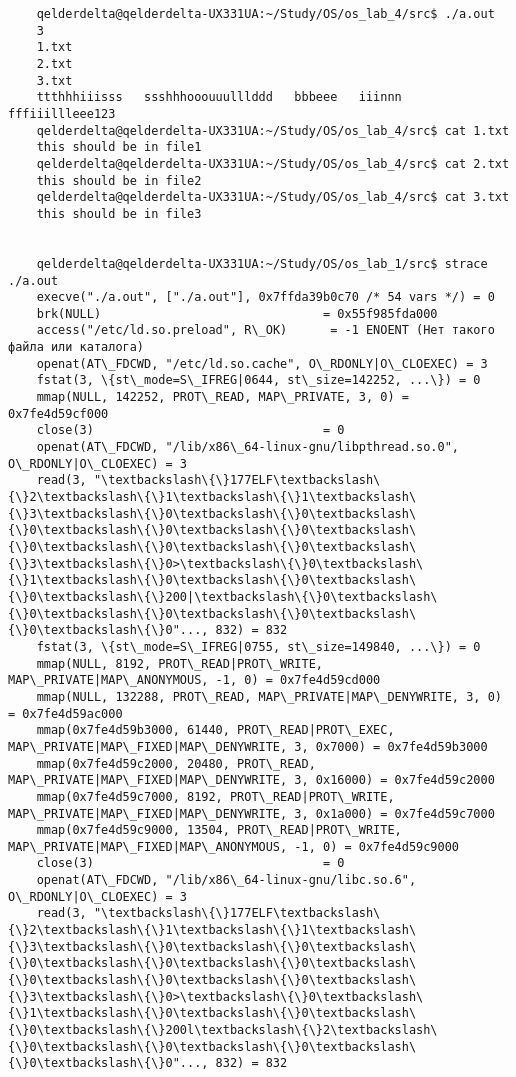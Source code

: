 \documentclass[a4paper, 12pt]{article}
\begin{document}
\begin{verbatim}
	qelderdelta@qelderdelta-UX331UA:~/Study/OS/os_lab_4/src$ ./a.out
	3
	1.txt
	2.txt
	3.txt
	ttthhhiiisss   ssshhhooouuulllddd   bbbeee   iiinnn   fffiiillleee123                            
	qelderdelta@qelderdelta-UX331UA:~/Study/OS/os_lab_4/src$ cat 1.txt
	this should be in file1
	qelderdelta@qelderdelta-UX331UA:~/Study/OS/os_lab_4/src$ cat 2.txt
	this should be in file2
	qelderdelta@qelderdelta-UX331UA:~/Study/OS/os_lab_4/src$ cat 3.txt
	this should be in file3
	
	
	qelderdelta@qelderdelta-UX331UA:~/Study/OS/os_lab_1/src$ strace ./a.out
	execve("./a.out", ["./a.out"], 0x7ffda39b0c70 /* 54 vars */) = 0
	brk(NULL)                               = 0x55f985fda000
	access("/etc/ld.so.preload", R\_OK)      = -1 ENOENT (Нет такого файла или каталога)
	openat(AT\_FDCWD, "/etc/ld.so.cache", O\_RDONLY|O\_CLOEXEC) = 3
	fstat(3, \{st\_mode=S\_IFREG|0644, st\_size=142252, ...\}) = 0
	mmap(NULL, 142252, PROT\_READ, MAP\_PRIVATE, 3, 0) = 0x7fe4d59cf000
	close(3)                                = 0
	openat(AT\_FDCWD, "/lib/x86\_64-linux-gnu/libpthread.so.0", O\_RDONLY|O\_CLOEXEC) = 3
	read(3, "\textbackslash\{\}177ELF\textbackslash\{\}2\textbackslash\{\}1\textbackslash\{\}1\textbackslash\{\}3\textbackslash\{\}0\textbackslash\{\}0\textbackslash\{\}0\textbackslash\{\}0\textbackslash\{\}0\textbackslash\{\}0\textbackslash\{\}0\textbackslash\{\}0\textbackslash\{\}3\textbackslash\{\}0>\textbackslash\{\}0\textbackslash\{\}1\textbackslash\{\}0\textbackslash\{\}0\textbackslash\{\}0\textbackslash\{\}200|\textbackslash\{\}0\textbackslash\{\}0\textbackslash\{\}0\textbackslash\{\}0\textbackslash\{\}0\textbackslash\{\}0"..., 832) = 832
	fstat(3, \{st\_mode=S\_IFREG|0755, st\_size=149840, ...\}) = 0
	mmap(NULL, 8192, PROT\_READ|PROT\_WRITE, MAP\_PRIVATE|MAP\_ANONYMOUS, -1, 0) = 0x7fe4d59cd000
	mmap(NULL, 132288, PROT\_READ, MAP\_PRIVATE|MAP\_DENYWRITE, 3, 0) = 0x7fe4d59ac000
	mmap(0x7fe4d59b3000, 61440, PROT\_READ|PROT\_EXEC, MAP\_PRIVATE|MAP\_FIXED|MAP\_DENYWRITE, 3, 0x7000) = 0x7fe4d59b3000
	mmap(0x7fe4d59c2000, 20480, PROT\_READ, MAP\_PRIVATE|MAP\_FIXED|MAP\_DENYWRITE, 3, 0x16000) = 0x7fe4d59c2000
	mmap(0x7fe4d59c7000, 8192, PROT\_READ|PROT\_WRITE, MAP\_PRIVATE|MAP\_FIXED|MAP\_DENYWRITE, 3, 0x1a000) = 0x7fe4d59c7000
	mmap(0x7fe4d59c9000, 13504, PROT\_READ|PROT\_WRITE, MAP\_PRIVATE|MAP\_FIXED|MAP\_ANONYMOUS, -1, 0) = 0x7fe4d59c9000
	close(3)                                = 0
	openat(AT\_FDCWD, "/lib/x86\_64-linux-gnu/libc.so.6", O\_RDONLY|O\_CLOEXEC) = 3
	read(3, "\textbackslash\{\}177ELF\textbackslash\{\}2\textbackslash\{\}1\textbackslash\{\}1\textbackslash\{\}3\textbackslash\{\}0\textbackslash\{\}0\textbackslash\{\}0\textbackslash\{\}0\textbackslash\{\}0\textbackslash\{\}0\textbackslash\{\}0\textbackslash\{\}0\textbackslash\{\}3\textbackslash\{\}0>\textbackslash\{\}0\textbackslash\{\}1\textbackslash\{\}0\textbackslash\{\}0\textbackslash\{\}0\textbackslash\{\}200l\textbackslash\{\}2\textbackslash\{\}0\textbackslash\{\}0\textbackslash\{\}0\textbackslash\{\}0\textbackslash\{\}0"..., 832) = 832

\end{verbatim}
\end{document}
